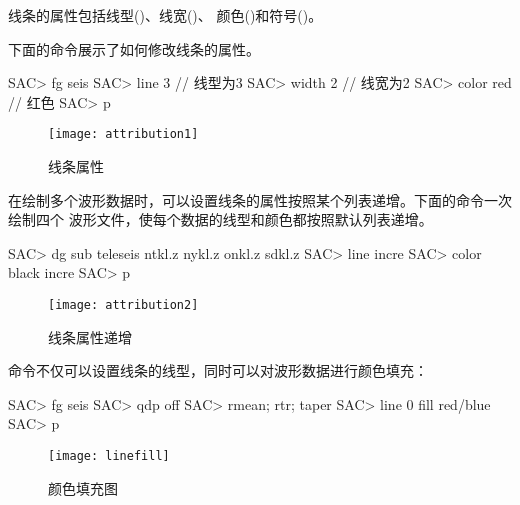 线条的属性包括线型()、线宽()、
颜色()和符号()。

下面的命令展示了如何修改线条的属性。
\begin{SACCode}
SAC> fg seis
SAC> line 3         // 线型为3
SAC> width 2        // 线宽为2
SAC> color red      // 红色
SAC> p
\end{SACCode}

\begin{figure}[H]
\centering
\texttt{[image: attribution1]}
\caption{线条属性}
\end{figure}

在绘制多个波形数据时，可以设置线条的属性按照某个列表递增。下面的命令一次绘制四个
波形文件，使每个数据的线型和颜色都按照默认列表递增。
\begin{SACCode}
SAC> dg sub teleseis ntkl.z nykl.z onkl.z sdkl.z
SAC> line incre
SAC> color black incre
SAC> p
\end{SACCode}

\begin{figure}[H]
\centering
\texttt{[image: attribution2]}
\caption{线条属性递增}
\end{figure}

命令不仅可以设置线条的线型，同时可以对波形数据进行颜色填充：
\begin{SACCode}
SAC> fg seis
SAC> qdp off
SAC> rmean; rtr; taper
SAC> line 0 fill red/blue
SAC> p 
\end{SACCode}

\begin{figure}[H]
\centering
\texttt{[image: linefill]}
\caption{颜色填充图}
\end{figure}
